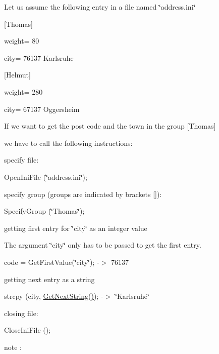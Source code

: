 Let us assume the following entry in a file named \char`\"{}address.\-ini\char`\"{}

\mbox{[}Thomas\mbox{]}

weight= 80

city= 76137 Karlsruhe

\mbox{[}Helmut\mbox{]}

weight= 280

city= 67137 Oggersheim

If we want to get the post code and the town in the group \mbox{[}Thomas\mbox{]}

we have to call the following instructions\-:

specify file\-:

Open\-Ini\-File (\char`\"{}address.\-ini\char`\"{});

specify group (groups are indicated by brackets \mbox{[}\mbox{]})\-:

Specify\-Group (\char`\"{}\-Thomas\char`\"{});

getting first entry for \char`\"{}city\char`\"{} as an integer value

The argument \char`\"{}city\char`\"{} only has to be passed to get the first entry.

code = Get\-First\-Value(\char`\"{}city\char`\"{}); -\/$>$ 76137

getting next entry as a string

strcpy (city, \hyperlink{classInifile_ab8462abdac3d6438f9c458c99e2870e0}{Get\-Next\-String()}); -\/$>$ \char`\"{}\-Karlsruhe\char`\"{}

closing file\-:

Close\-Ini\-File ();

note \-:

